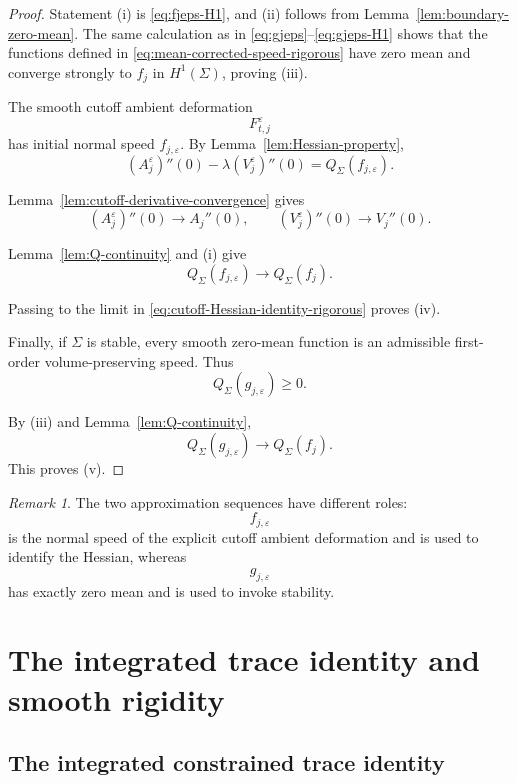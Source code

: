 \documentclass[11pt,reqno]{amsart}
\numberwithin{equation}{section}
\theoremstyle{definition}
\theoremstyle{remark}
\newtheorem{remark}[theorem]{Remark}
\newcommand{\eps}{\varepsilon}
\begin{document}
\begin{proof}
Statement (i) is \eqref{eq:fjeps-H1}, and (ii) follows from
Lemma~\ref{lem:boundary-zero-mean}.  The same calculation as in
\eqref{eq:gjeps}--\eqref{eq:gjeps-H1} shows that the functions defined in
\eqref{eq:mean-corrected-speed-rigorous} have zero mean and converge strongly
to \(f_j\) in \(H^1(\Sigma)\), proving (iii).

The smooth cutoff ambient deformation
\[
F^\eps_{t,j}
\]
has initial normal speed \(f_{j,\eps}\). By
Lemma~\ref{lem:Hessian-property},
\begin{equation}
(A^\eps_j)''(0)
-
\lambda(V^\eps_j)''(0)
=
Q_\Sigma(f_{j,\eps}).
\label{eq:cutoff-Hessian-identity-rigorous}
\end{equation}

Lemma~\ref{lem:cutoff-derivative-convergence} gives
\[
(A^\eps_j)''(0)\to A_j''(0),
\qquad
(V^\eps_j)''(0)\to V_j''(0).
\]

Lemma~\ref{lem:Q-continuity} and (i) give
\[
Q_\Sigma(f_{j,\eps})
\longrightarrow
Q_\Sigma(f_j).
\]

Passing to the limit in
\eqref{eq:cutoff-Hessian-identity-rigorous} proves (iv).

Finally, if \(\Sigma\) is stable, every smooth zero-mean function is an
admissible first-order volume-preserving speed. Thus
\[
Q_\Sigma(g_{j,\eps})\ge0.
\]

By (iii) and Lemma~\ref{lem:Q-continuity},
\[
Q_\Sigma(g_{j,\eps})
\longrightarrow
Q_\Sigma(f_j).
\]
This proves (v).
\end{proof}

\begin{remark}
The two approximation sequences have different roles:
\[
f_{j,\eps}
\]
is the normal speed of the explicit cutoff ambient deformation and is used
to identify the Hessian, whereas
\[
g_{j,\eps}
\]
has exactly zero mean and is used to invoke stability.
\end{remark}

\section{The integrated trace identity and smooth rigidity}\label{sec:integrated-trace}
\subsection{The integrated constrained trace identity}
\end{document}
